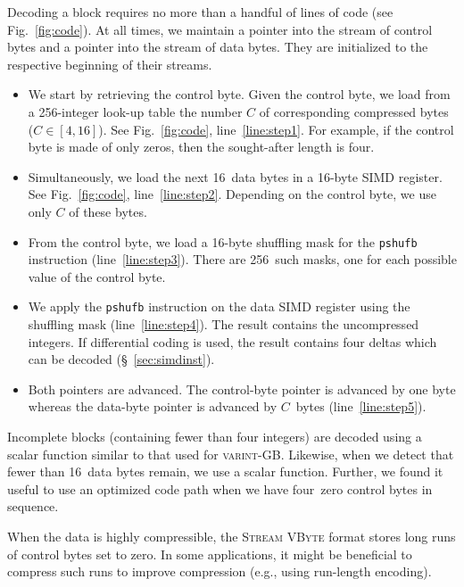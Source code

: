\documentclass[compress]{elsarticle}
\newcommand{\vbyte}{VByte}
\newcommand{\varintgb}{\textsc{varint-GB}}
\newcommand{\streamvbyte}{\textsc{Stream \vbyte{}}}
\begin{document}
Decoding a block requires no more than a handful of lines of code (see Fig.~\ref{fig:code}).
At all times, we maintain a pointer into the stream of control bytes and a pointer into the stream of data bytes. They are initialized to the respective beginning of their streams.
\begin{itemize}[noitemsep,nolistsep,leftmargin=10pt]
\item We start by retrieving the control byte.
 Given the control byte, we load from a 256-integer look-up table the number $C$ of corresponding  compressed bytes ($C\in [4,16]$). See Fig.~\ref{fig:code}, line~\ref{line:step1}. For example, if  the control byte is made of only zeros, then  the sought-after length is four.
\item Simultaneously, we load the next 16~data bytes in a 16-byte SIMD register. See Fig.~\ref{fig:code}, line~\ref{line:step2}. Depending on the control byte, we use only $C$ of these bytes.
\item From the control byte, we load a 16-byte shuffling mask for the \texttt{pshufb} instruction (line~\ref{line:step3}). There are 256~such masks, one for each possible value of the control byte.
\item We apply the \texttt{pshufb} instruction on the data SIMD register using the shuffling mask  (line~\ref{line:step4}). The result contains the uncompressed integers. If differential coding is used, the result contains four deltas which can be decoded (\S~\ref{sec:simdinst}).
\item Both pointers are advanced. The control-byte pointer is advanced by one byte whereas the data-byte pointer is advanced by $C$~bytes (line~\ref{line:step5}).
\end{itemize}
Incomplete blocks (containing fewer than four integers) are decoded using a scalar function similar to that used for \varintgb{}. Likewise, when we detect that fewer than 16~data bytes remain, we use a scalar function. Further, we found it useful to use an optimized code path when
we have four~zero control bytes in sequence.




When the data is highly compressible,  the \streamvbyte{}
format stores long runs of control bytes set to zero. In some applications, it might be beneficial
to compress such runs to improve compression (e.g., using run-length encoding).
\end{document}
